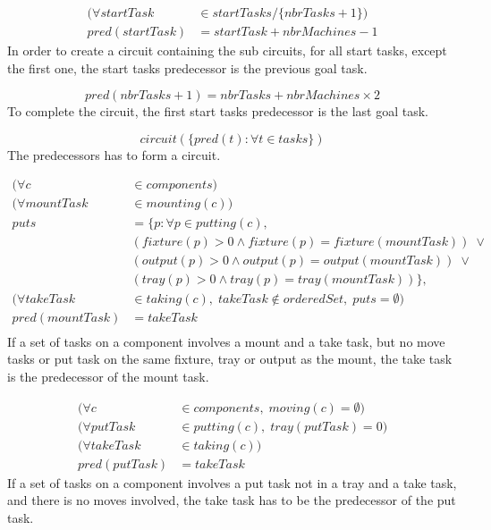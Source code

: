  \begin{equation}\label{eq:109}
 \begin{aligned}
 (\forall startTask &\in startTasks / \{nbrTasks + 1\}) \\
 pred(startTask) &= startTask + nbrMachines - 1
 \end{aligned}
 \end{equation}
 In order to create a circuit containing the sub circuits, for all start tasks, except the first one, the start tasks predecessor is the previous goal task.
 
 \begin{equation}\label{eq:110}
 pred(nbrTasks + 1) = nbrTasks + nbrMachines \times 2\end{equation}
 To complete the circuit, the first start tasks predecessor is the last goal task.
 
 \begin{equation}\label{eq:111}
 circuit(\{pred(t) : \forall t \in tasks\})\end{equation}
 The predecessors has to form a circuit.
 
 \begin{equation}
 \begin{aligned}\label{eq:112}
 (\forall c &\in components) \\
 (\forall mountTask &\in mounting(c)) \\
 puts &= \{p : \forall p \in putting(c),\\
 &(fixture(p) > 0 \land fixture(p) = fixture(mountTask)) \; \lor  \\
 &(output(p) > 0 \land output(p) = output(mountTask)) \; \lor  \\
 &(tray(p) > 0 \land tray(p) = tray(mountTask))\}, \\
 (\forall takeTask &\in taking(c), \; takeTask \notin orderedSet, \; puts = \emptyset) \\
 pred(mountTask) &= takeTask \\
 \end{aligned}
 \end{equation}
 If a set of tasks on a component involves a mount and a take task, but no move tasks or put task on the same fixture, tray or output as the mount, the take task is the predecessor of the mount task.
 
 \begin{equation}
 \begin{aligned}\label{eq:113}
 (\forall c &\in components, \; moving(c) = \emptyset)\\
 (\forall putTask &\in putting(c), \; tray(putTask) = 0)\\
 (\forall takeTask &\in taking(c))\\
 pred(putTask) &= takeTask
 \end{aligned}
 \end{equation}
 If a set of tasks on a component involves a put task not in a tray and a take task, and there is no moves involved, the take task has to be the predecessor of the put task.
 
